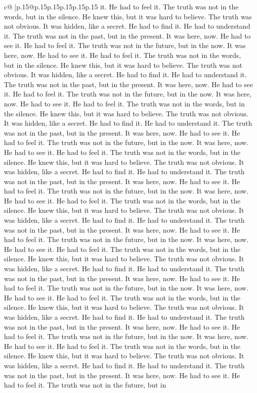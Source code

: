 \documentclass{article}
\begin{document}
{\begin{supertabular}{c@{$\;$}|p{.15\linewidth}@{}p{.15\linewidth}p{.15\linewidth}p{.15\linewidth}p{.15\linewidth}p{.15\linewidth}}
{{{it. He had to feel it. The truth was not in the words, but in the silence. He knew this, but it was hard to believe. The truth was not obvious. It was hidden, like a secret. He had to find it. He had to understand it. The truth was not in the past, but in the present. It was here, now. He had to see it. He had to feel it. The truth was not in the future, but in the now. It was here, now. He had to see it. He had to feel it. The truth was not in the words, but in the silence. He knew this, but it was hard to believe. The truth was not obvious. It was hidden, like a secret. He had to find it. He had to understand it. The truth was not in the past, but in the present. It was here, now. He had to see it. He had to feel it. The truth was not in the future, but in the now. It was here, now. He had to see it. He had to feel it. The truth was not in the words, but in the silence. He knew this, but it was hard to believe. The truth was not obvious. It was hidden, like a secret. He had to find it. He had to understand it. The truth was not in the past, but in the present. It was here, now. He had to see it. He had to feel it. The truth was not in the future, but in the now. It was here, now. He had to see it. He had to feel it. The truth was not in the words, but in the silence. He knew this, but it was hard to believe. The truth was not obvious. It was hidden, like a secret. He had to find it. He had to understand it. The truth was not in the past, but in the present. It was here, now. He had to see it. He had to feel it. The truth was not in the future, but in the now. It was here, now. He had to see it. He had to feel it. The truth was not in the words, but in the silence. He knew this, but it was hard to believe. The truth was not obvious. It was hidden, like a secret. He had to find it. He had to understand it. The truth was not in the past, but in the present. It was here, now. He had to see it. He had to feel it. The truth was not in the future, but in the now. It was here, now. He had to see it. He had to feel it. The truth was not in the words, but in the silence. He knew this, but it was hard to believe. The truth was not obvious. It was hidden, like a secret. He had to find it. He had to understand it. The truth was not in the past, but in the present. It was here, now. He had to see it. He had to feel it. The truth was not in the future, but in the now. It was here, now. He had to see it. He had to feel it. The truth was not in the words, but in the silence. He knew this, but it was hard to believe. The truth was not obvious. It was hidden, like a secret. He had to find it. He had to understand it. The truth was not in the past, but in the present. It was here, now. He had to see it. He had to feel it. The truth was not in the future, but in the now. It was here, now. He had to see it. He had to feel it. The truth was not in the words, but in the silence. He knew this, but it was hard to believe. The truth was not obvious. It was hidden, like a secret. He had to find it. He had to understand it. The truth was not in the past, but in the present. It was here, now. He had to see it. He had to feel it. The truth was not in the future, but in }}}
\end{supertabular}}
\end{document}
